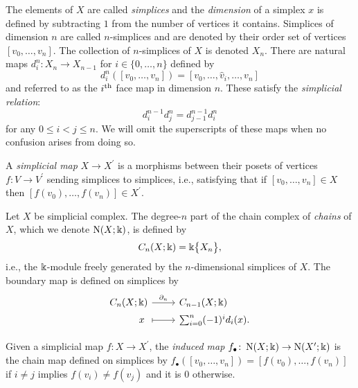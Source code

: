 The elements of $X$ are called \textit{simplices} and the \textit{dimension} of a simplex $x$ is defined by subtracting $1$ from the number of vertices it contains.
Simplices of dimension $n$ are called $n$-simplices and are denoted by their order set of vertices $[v_0, \dots, v_n]$.
The collection of $n$-simplices of $X$ is denoted $X_n$.
There are natural maps $d_i^n \colon X_n \to X_{n-1}$ for $i \in \{0, \dots, n\}$ defined by
\begin{equation*}
d_i^n([v_0, \dots, v_n]) = [v_0, \dots, \widehat{v}_i, \dots, v_n]
\end{equation*}
and referred to as the $i^{\mathrm{th}}$ face map in dimension $n$.
These satisfy the \textit{simplicial relation}:
\begin{equation} \label{e:simplicial relation}
d_i^{n-1} d^n_j = d_{j-1}^{n-1} d_i^n
\end{equation}
for any $0 \leq i < j \leq n$.
We will omit the superscripts of these maps when no confusion arises from doing so.

A \textit{simplicial map} $X \to X^\prime$ is a morphisms between their posets of vertices $f \colon V \to V^\prime$ sending simplices to simplices, i.e., satisfying that if $[v_0, \dots, v_n] \in X$ then $[f(v_0), \dots, f(v_n)] \in X^\prime$.

Let $X$ be simplicial complex.
The degree-$n$ part of the chain complex of \textit{chains} of $X$, which we denote $\operatorname{N}(X; \Bbbk)$, is defined by
\begin{equation*}
C_n(X; \Bbbk) = \Bbbk \big\{ X_n \big\},
\end{equation*}
i.e., the $\Bbbk$-module freely generated by the $n$-dimensional simplices of $X$.
The boundary map is defined on simplices by
\begin{equation*}
\begin{tikzcd}[column sep=normal, row sep=tiny,row sep = 0ex
,/tikz/column 1/.append style={anchor=base east}
,/tikz/column 2/.append style={anchor=base west}
]
C_n(X; \k) \arrow[r, "\partial_n"] & C_{n-1}(X; \k) \\
x\ \arrow[r, |->] & \sum_{i=0}^{n} (-1)^i d_i (x).
\end{tikzcd}
\end{equation*}

Given a simplicial map $f \colon X \to X^\prime$, the \textit{induced map} $f_\bullet \colon \operatorname{N}(X; \Bbbk) \to \operatorname{N}(X^\prime; \Bbbk)$ is the chain map defined on simplices by $f_\bullet([v_0, \dots, v_n]) = [f(v_0), \dots, f(v_n)]$ if $i \neq j$ implies $ f(v_i) \neq f(v_j)$ and it is $0$ otherwise.

